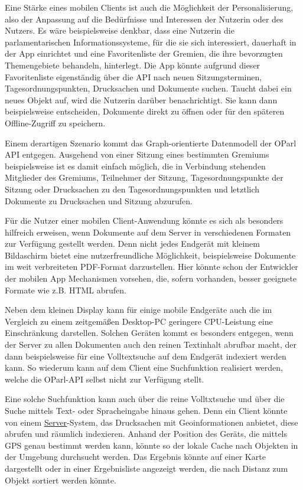 \documentclass[,a4paper]{article}
\begin{document}
Eine Stärke eines mobilen Clients ist auch die Möglichkeit der
Personalisierung, also der Anpassung auf die Bedürfnisse und Interessen
der Nutzerin oder des Nutzers. Es wäre beispielsweise denkbar, dass eine
Nutzerin die parlamentarischen Informationssysteme, für die sie sich
interessiert, dauerhaft in der App einrichtet und eine Favoritenliste
der Gremien, die ihre bevorzugten Themengebiete behandeln, hinterlegt.
Die App könnte aufgrund dieser Favoritenliste eigenständig über die API
nach neuen Sitzungsterminen, Tagesordnungspunkten, Drucksachen und
Dokumente suchen. Taucht dabei ein neues Objekt auf, wird die Nutzerin
darüber benachrichtigt. Sie kann dann beispielsweise entscheiden,
Dokumente direkt zu öffnen oder für den späteren Offline-Zugriff zu
speichern.

Einem derartigen Szenario kommt das Graph-orientierte Datenmodell der
OParl API entgegen. Ausgehend von einer Sitzung eines bestimmten
Gremiums beispielsweise ist es damit einfach möglich, die in Verbindung
stehenden Mitglieder des Gremiums, Teilnehmer der Sitzung,
Tagesordnungspunkte der Sitzung oder Drucksachen zu den
Tagesordnungspunkten und letztlich Dokumente zu Drucksachen und Sitzung
abzurufen.

Für die Nutzer einer mobilen Client-Anwendung könnte es sich als
besonders hilfreich erweisen, wenn Dokumente auf dem Server in
verschiedenen Formaten zur Verfügung gestellt werden. Denn nicht jedes
Endgerät mit kleinem Bildaschirm bietet eine nutzerfreundliche
Möglichkeit, beispielsweise Dokumente im weit verbreiteten PDF-Format
darzustellen. Hier könnte schon der Entwickler der mobilen App
Mechanismen vorsehen, die, sofern vorhanden, besser geeignete Formate
wie z.B. HTML abrufen.

Neben dem kleinen Display kann für einige mobile Endgeräte auch die im
Vergleich zu einem zeitgemäßen Desktop-PC geringere CPU-Leistung eine
Einschränkung darstellen. Solchen Geräten kommt es besonders entgegen,
wenn der Server zu allen Dokumenten auch den reinen Textinhalt abrufbar
macht, der dann beispielsweise für eine Volltextsuche auf dem Endgerät
indexiert werden kann. So wiederum kann auf dem Client eine Suchfunktion
realisiert werden, welche die OParl-API selbst nicht zur Verfügung
stellt.

Eine solche Suchfunktion kann auch über die reine Volltxtsuche und über
die Suche mittels Text- oder Spracheingabe hinaus gehen. Denn ein Client
könnte von einem \hyperref[server]{Server}-System, das Drucksachen mit
Geoinformationen anbietet, diese abrufen und räumlich indexieren. Anhand
der Position des Geräts, die mittels GPS genau bestimmt werden kann,
könnte so der lokale Cache nach Objekten in der Umgebung durchsucht
werden. Das Ergebnis könnte auf einer Karte dargestellt oder in einer
Ergebnisliste angezeigt werden, die nach Distanz zum Objekt sortiert
werden könnte.
\end{document}
